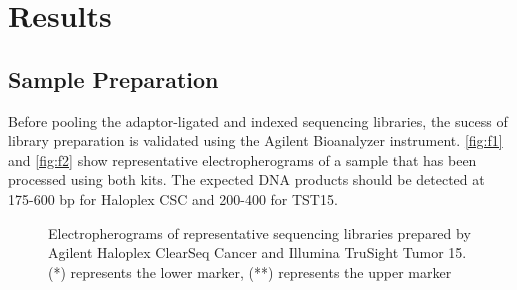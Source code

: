 \section{Results}\label{Sec:Results}

\subsection{Sample Preparation}

Before pooling the adaptor-ligated and indexed sequencing libraries, the sucess of
library preparation is validated using the Agilent Bioanalyzer instrument. \ref{fig:f1}
and \ref{fig:f2} show representative electropherograms of a sample that has been
processed using both kits. The expected DNA products should be detected at 175-600 bp
for Haloplex CSC and 200-400 for TST15.

\begin{figure}[!htbp]
  \centering
  \hfill
  \caption{Electropherograms of representative sequencing libraries prepared by Agilent Haloplex ClearSeq Cancer and Illumina TruSight Tumor 15. (*) represents the lower marker, (**) represents the upper marker}
\end{figure}

